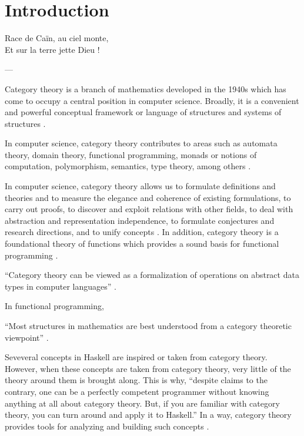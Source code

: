 \chapter{Introduction}
\label{chap:introduction}

\epigraph{
  Race de Caïn, au ciel monte,\\
  Et sur la terre jette Dieu !
}{---\textcite[16]{baudelaire-1857}}

Category theory is a branch of mathematics developed in the 1940s
which has come to occupy a central position in computer science.
Broadly, it is a convenient and powerful conceptual framework or
language of structures and systems of structures
\parencites[vii]{maclane-1998}[1]{marquis-2013}[1154]{wolfram-2002}.

In computer science, category theory contributes to areas such as
automata theory, domain theory, functional programming, monads or
notions of computation, polymorphism, semantics, type theory, among
others
\parencites[23]{marquis-2013}{nlab-category-theory}[xi]{pierce-1991}[415]{poigne-1992}.

In computer science, category theory allows us to formulate
definitions and theories and to measure the elegance and coherence of
existing formulations, to carry out proofs, to discover and exploit
relations with other fields, to deal with abstraction and
representation independence, to formulate conjectures and research
directions, and to unify concepts \parencites[49--50]{goguen-1991}. In
addition, category theory is a foundational theory of functions which
provides a sound basis for functional programming
\parencite[414]{poigne-1992}.

``Category theory can be viewed as a formalization of operations on
abstract data types in computer languages''
\parencite[1154]{wolfram-2002}.






In functional programming,



``Most structures in mathematics are best understood from a category
theoretic viewpoint'' \parencite{nlab-category-theory}.



Seveveral concepts in Haskell are inspired or taken from category
theory. However, when these concepts are taken from category theory,
very little of the theory around them is brought along. This is why,
``despite claims to the contrary, one can be a perfectly competent
programmer without knowing anything at all about category theory. But,
if you are familiar with category theory, you can turn around and
apply it to Haskell.'' In a way, category theory provides tools for
analyzing and building such concepts \parencite[73]{elkins-2009}.


